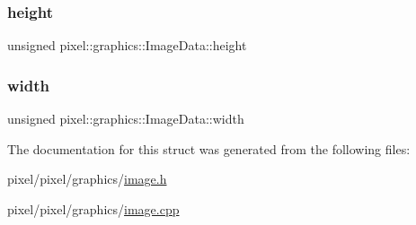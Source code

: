 \subsubsection{\texorpdfstring{height}{height}}
{\footnotesize\ttfamily unsigned pixel\+::graphics\+::\+Image\+Data\+::height}

\mbox{\label{structpixel_1_1graphics_1_1_image_data_a783c857c18bf3d306f08ff990d0a0387}} 
\subsubsection{\texorpdfstring{width}{width}}
{\footnotesize\ttfamily unsigned pixel\+::graphics\+::\+Image\+Data\+::width}



The documentation for this struct was generated from the following files\+:\begin{DoxyCompactItemize}
\item 
pixel/pixel/graphics/\hyperlink{image_8h}{image.\+h}\item 
pixel/pixel/graphics/\hyperlink{image_8cpp}{image.\+cpp}\end{DoxyCompactItemize}
